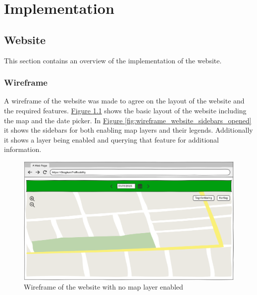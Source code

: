\chapter{Implementation}

\section{Website}
This section contains an overview of the implementation of the website.

\subsection{Wireframe} %
A wireframe of the website was made to agree on the layout of the website and the required features. \hyperref[fig:wireframe_website_sidebars_closed]{Figure \ref*{fig:wireframe_website_sidebars_closed}} shows the basic layout of the website including the map and the date picker. In \hyperref[fig:wireframe_website_sidebars_opened]{Figure \ref*{fig:wireframe_website_sidebars_opened}} it shows the sidebars for both enabling map layers and their legends. Additionally it shows a layer being enabled and querying that feature for additional information.
\begin{figure}[h]
    \centering
    \includegraphics[width=0.6\linewidth]{figures/wireframe_website_sidebars_closed.pdf} 
    \caption{Wireframe of the website with no map layer enabled}
    \label{fig:wireframe_website_sidebars_closed}
\end{figure}

